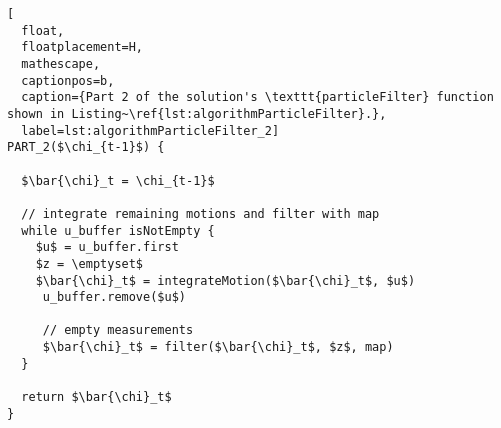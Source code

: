\begin{lstlisting}[
  float,
  floatplacement=H,
  mathescape,
  captionpos=b,
  caption={Part 2 of the solution's \texttt{particleFilter} function shown in Listing~\ref{lst:algorithmParticleFilter}.},
  label=lst:algorithmParticleFilter_2]
PART_2($\chi_{t-1}$) {

  $\bar{\chi}_t = \chi_{t-1}$

  // integrate remaining motions and filter with map
  while u_buffer isNotEmpty {
    $u$ = u_buffer.first
    $z = \emptyset$
    $\bar{\chi}_t$ = integrateMotion($\bar{\chi}_t$, $u$)
     u_buffer.remove($u$)

     // empty measurements
     $\bar{\chi}_t$ = filter($\bar{\chi}_t$, $z$, map)
  }

  return $\bar{\chi}_t$
}
\end{lstlisting}
